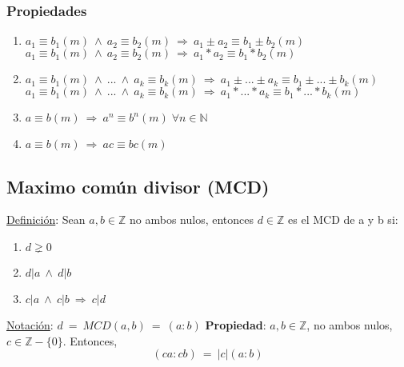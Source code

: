 \documentclass{article}
\newcommand{\lands}{\:\land\:}                          %
\newcommand{\eq}{\:=\:}                                 %
\newcommand{\enteros}{\mathbb{Z}}                       %
\newcommand{\vabs}[1]{\left\lvert #1 \right\rvert }     %
\newcommand{\Rightarrows}{\: \Rightarrow \:}            %
\begin{document}
\subsubsection*{Propiedades}
\begin{enumerate}
    \item $a_1 \equiv b_1 (m) \lands a_2 \equiv b_2 (m) \Rightarrows a_1 \pm a_2 \equiv b_1 \pm b_2 (m)$
    \\ $a_1 \equiv b_1 (m) \lands a_2 \equiv b_2 (m) \Rightarrows a_1 * a_2 \equiv b_1 * b_2 (m)$
    \item $a_1 \equiv b_1 (m) \lands ... \lands a_k \equiv b_k (m) \Rightarrows a_1 \pm ... \pm a_k \equiv b_1 \pm ... \pm b_k (m)$
    \\ $a_1 \equiv b_1 (m) \lands ... \lands a_k \equiv b_k (m) \Rightarrows a_1 * ... * a_k \equiv b_1 * ... * b_k (m)$
    \item $a \equiv b (m) \Rightarrows a^n \equiv b^n (m) \; \forall n \in \mathbb{N}$
    \item $a \equiv b (m) \Rightarrows ac \equiv bc (m)$
\end{enumerate}

\subsection{Maximo común divisor (MCD)}
\underline{Definición}: Sean $a, b \in \mathbb{Z}$ no ambos nulos, entonces $d \in \mathbb{Z}$ es el MCD de a y b si:
\begin{enumerate}
    \item $d \gneq 0$
    \item $d|a \lands d|b$
    \item $c|a \lands c|b \Rightarrows c|d$
\end{enumerate}
\underline{Notación}: $d \eq MCD(a,b) \eq (a : b)$
\textbf{Propiedad}: $a, b \in \enteros$, no ambos nulos, $c \in \enteros - \{0\}$. Entonces,
\begin{equation*}
    (ca:cb)\eq \vabs{c}(a:b)
\end{equation*}
\end{document}
